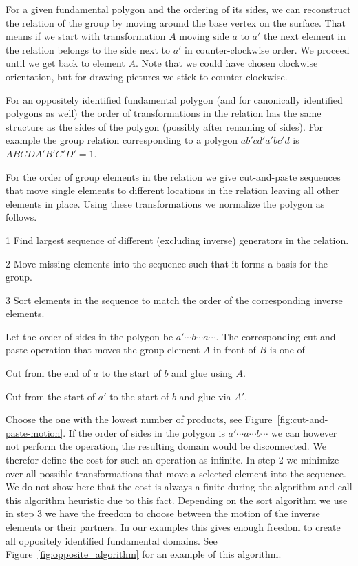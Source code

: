 \documentclass[Thesis]{subfiles}
\begin{document}
 For a given fundamental polygon and the ordering of its sides, we can reconstruct the relation of the group by moving around the base vertex on the surface. That means if we start with transformation $A$ moving side $a$ to $a'$ the next element in the relation belongs to the side next to $a'$ in counter-clockwise order. We proceed until we get back to element $A$. Note that we could have chosen clockwise orientation, but for drawing pictures we stick to counter-clockwise.

 For an oppositely identified fundamental polygon (and for canonically identified polygons as well) the order of transformations in the relation has the same structure as the sides of the polygon (possibly after renaming of sides). For example the group relation corresponding to a polygon $ab'cd'a'bc'd$ is $ABCDA'B'C'D'=1$.

 For the order of group elements in the relation we give cut-and-paste sequences that move single elements to different locations in the relation leaving all other elements in place. Using these transformations we normalize the polygon as follows.

 \begin{compactitem}
 \item[1] Find largest sequence of different (excluding inverse) generators in the relation.
 \item[2] Move missing elements into the sequence such that it forms a basis for the group.
 \item[3] Sort elements in the sequence to match the order of the corresponding inverse elements.
 \end{compactitem}

 Let the order of sides in the polygon be $a' \cdots b \cdots a \cdots$. The corresponding cut-and-paste operation that moves the group element $A$ in front of $B$ is one of

 \begin{compactitem}
 \item Cut from the end of $a$ to the start of $b$ and glue using $A$.
 \item Cut from the start of $a'$ to the start of $b$ and glue via $A'$.
 \end{compactitem}

 Choose the one with the lowest number of products, see Figure~\ref{fig:cut-and-paste-motion}. If the order of sides in the polygon is $a' \cdots a \cdots b \cdots$ we can however not perform the operation, the resulting domain would be disconnected. We therefor define the cost for such an operation as infinite. In step 2 we minimize over all possible transformations that move a selected element into the sequence. We do not show here that the cost is always a finite during the algorithm and call this algorithm heuristic due to this fact. Depending on the sort algorithm we use in step 3 we have the freedom to choose between the motion of the inverse elements or their partners. In our examples this gives enough freedom to create all oppositely identified fundamental domains. See Figure~\ref{fig:opposite_algorithm} for an example of this algorithm.
\end{document}
